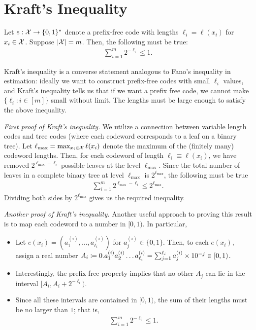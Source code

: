\documentclass[12pt]{article}
\begin{document}
\section{Kraft's Inequality}
\label{sec:kraft}

\begin{theorem}
\label{thm:kraft} Let $e:{\cal X} \to \{0,1\}^*$ denote a prefix-free code with lengths $\ell_i = \ell(x_i)$ for $x_i \in {\cal X}$. Suppose $|{\cal X}| = m$. Then, the following must be true: 
\begin{align}
\sum_{i=1}^m 2^{-\ell_i} \leq 1. 
\end{align}
\end{theorem}

\begin{remark}
Kraft's inequality is a converse statement analogous to Fano's inequality in estimation: ideally we want to construct prefix-free codes with small $\ell_i$ values, and Kraft's inequality tells us that if we want a prefix free code, we cannot make $\{\ell_i: i \in [m]\}$ small without limit. The lengths must be large enough to satisfy the above inequality. 
\end{remark}

\emph{First proof of Kraft's inequality.} We utilize a connection between variable length codes and tree codes (where each codeword corresponds to a leaf on a binary tree). Let $\ell_{\max} = \max_{x_i \in {\cal X}} \ell(x_i)$ denote the maximum of the (finitely many) codeword lengths. Then, for each codeword of length $\ell_i \equiv \ell(x_i)$, we have removed $2^{\ell_{\max}-\ell_i}$ possible leaves at the level $\ell_{\max}$. Since the total number of leaves in a complete binary tree at level $\ell_{\max}$ is $2^{\ell_{\max}}$, the following must be true 
\begin{align}
	\sum_{i=1}^m 2^{\ell_{\max}-\ell_i} \leq 2^{\ell_{\max}}. 
\end{align}
Dividing both sides by $2^{\ell_{\max}}$ gives us the required inequality. 

\emph{Another proof of Kraft's inequality.} Another useful approach to proving this result is to map each codeword to a number in $[0,1)$. In particular, 
\begin{itemize}
	\item Let $e(x_i) = (a_1^{(i)}, \ldots, a_{\ell_i}^{(i)})$ for $a_j^{(i)} \in \{0, 1\}$. Then, to each $e(x_i)$, assign a real number $A_i \coloneqq 0.a_1^{(i)}a_2^{(i)}\ldots a_{\ell_i}^{(i)} = \sum_{j=1}^{\ell_{i}} a_j^{(i)} \times 10^{-j} \in [0, 1)$. 

	\item Interestingly, the prefix-free property implies that no other $A_j$ can lie in the interval $[A_i, A_i + 2^{-\ell_i})$. 
	\item Since all these intervals are contained in $[0, 1)$, the sum of their lengths must be no larger than $1$; that is, 
	\begin{align}
		\sum_{i=1}^m 2^{-\ell_i} \leq 1. 
	\end{align}
\end{itemize}
\end{document}
